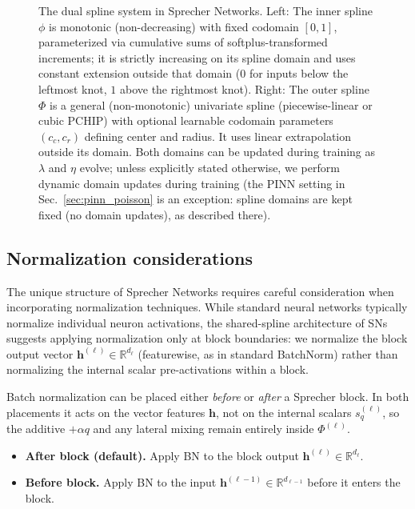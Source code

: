 \documentclass{article}
\theoremstyle{plain}
\theoremstyle{definition}
\theoremstyle{remark}
\begin{document}
\begin{figure}[ht]
    \caption{The dual spline system in Sprecher Networks. Left: The inner spline $\phi$ is monotonic (non-decreasing) with fixed codomain $[0, 1]$, parameterized via cumulative sums of softplus-transformed increments; it is strictly increasing on its spline domain and uses constant extension outside that domain ($0$ for inputs below the leftmost knot, $1$ above the rightmost knot). Right: The outer spline $\Phi$ is a general (non-monotonic) univariate spline (piecewise-linear or cubic PCHIP) with optional learnable codomain parameters $(c_c, c_r)$ defining center and radius. It uses linear extrapolation outside its domain. Both domains can be updated during training as $\lambda$ and $\eta$ evolve; unless explicitly stated otherwise, we perform dynamic domain updates during training (the PINN setting in Sec.~\ref{sec:pinn_poisson} is an exception: spline domains are kept fixed (no domain updates), as described there).}
    \label{fig:dual_splines}
\end{figure}

\subsection{Normalization considerations}\label{sec:normalization}

The unique structure of Sprecher Networks requires careful consideration when incorporating normalization techniques. While standard neural networks typically normalize individual neuron activations, the shared-spline architecture of SNs suggests applying normalization only at block boundaries: we normalize the block output vector $\mathbf{h}^{(\ell)} \in \mathbb{R}^{d_\ell}$ (featurewise, as in standard BatchNorm) rather than normalizing the internal scalar pre-activations within a block.

Batch normalization can be placed either \emph{before} or \emph{after} a Sprecher block. In both placements it acts on the vector features $\mathbf{h}$, not on the internal scalars $s^{(\ell)}_q$, so the additive $+\alpha q$ and any lateral mixing remain entirely inside $\Phi^{(\ell)}$.
\begin{itemize}
    \item \textbf{After block (default).} Apply BN to the block output $\mathbf{h}^{(\ell)} \in \mathbb{R}^{d_\ell}$.
    \item \textbf{Before block.} Apply BN to the input $\mathbf{h}^{(\ell-1)} \in \mathbb{R}^{d_{\ell-1}}$ before it enters the block.
\end{itemize}
\end{document}
